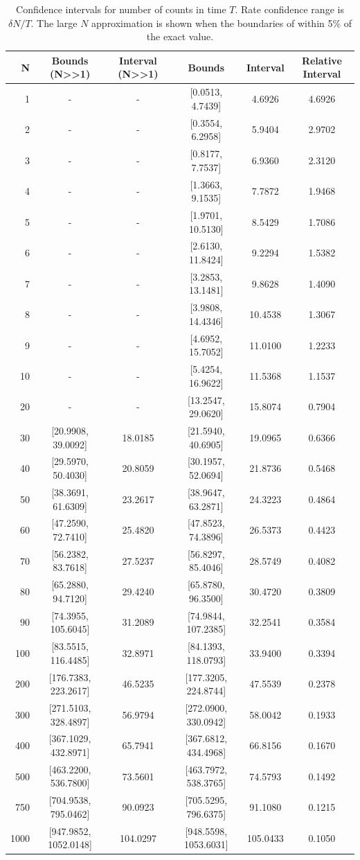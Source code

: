 \documentclass{article}
\begin{document}
\begin{table}
    \begin{tabular}{r|c|c|c|c|c}
     \hline
N & Bounds (N>>1) & Interval (N>>1) & Bounds & Interval & Relative Interval\\ 
\hline 
1 & - & - & [0.0513, 4.7439] & 4.6926 & 4.6926\\ 
2 & - & - & [0.3554, 6.2958] & 5.9404 & 2.9702\\ 
3 & - & - & [0.8177, 7.7537] & 6.9360 & 2.3120\\ 
4 & - & - & [1.3663, 9.1535] & 7.7872 & 1.9468\\ 
5 & - & - & [1.9701, 10.5130] & 8.5429 & 1.7086\\ 
6 & - & - & [2.6130, 11.8424] & 9.2294 & 1.5382\\ 
7 & - & - & [3.2853, 13.1481] & 9.8628 & 1.4090\\ 
8 & - & - & [3.9808, 14.4346] & 10.4538 & 1.3067\\ 
9 & - & - & [4.6952, 15.7052] & 11.0100 & 1.2233\\ 
10 & - & - & [5.4254, 16.9622] & 11.5368 & 1.1537\\ 
20 & - & - & [13.2547, 29.0620] & 15.8074 & 0.7904\\ 
30 & [20.9908, 39.0092] & 18.0185 & [21.5940, 40.6905] & 19.0965 & 0.6366\\ 
40 & [29.5970, 50.4030] & 20.8059 & [30.1957, 52.0694] & 21.8736 & 0.5468\\ 
50 & [38.3691, 61.6309] & 23.2617 & [38.9647, 63.2871] & 24.3223 & 0.4864\\ 
60 & [47.2590, 72.7410] & 25.4820 & [47.8523, 74.3896] & 26.5373 & 0.4423\\ 
70 & [56.2382, 83.7618] & 27.5237 & [56.8297, 85.4046] & 28.5749 & 0.4082\\ 
80 & [65.2880, 94.7120] & 29.4240 & [65.8780, 96.3500] & 30.4720 & 0.3809\\ 
90 & [74.3955, 105.6045] & 31.2089 & [74.9844, 107.2385] & 32.2541 & 0.3584\\ 
100 & [83.5515, 116.4485] & 32.8971 & [84.1393, 118.0793] & 33.9400 & 0.3394\\ 
200 & [176.7383, 223.2617] & 46.5235 & [177.3205, 224.8744] & 47.5539 & 0.2378\\ 
300 & [271.5103, 328.4897] & 56.9794 & [272.0900, 330.0942] & 58.0042 & 0.1933\\ 
400 & [367.1029, 432.8971] & 65.7941 & [367.6812, 434.4968] & 66.8156 & 0.1670\\ 
500 & [463.2200, 536.7800] & 73.5601 & [463.7972, 538.3765] & 74.5793 & 0.1492\\ 
750 & [704.9538, 795.0462] & 90.0923 & [705.5295, 796.6375] & 91.1080 & 0.1215\\ 
1000 & [947.9852, 1052.0148] & 104.0297 & [948.5598, 1053.6031] & 105.0433 & 0.1050\\ 
\end{tabular}
\caption{Confidence intervals for number of counts in time $T$.  Rate confidence range is $\delta N/T$.  The large $N$ approximation is shown when the boundaries of within 5\% of the exact value.}
\label{tab:conf}
\end{table}
\end{document}
